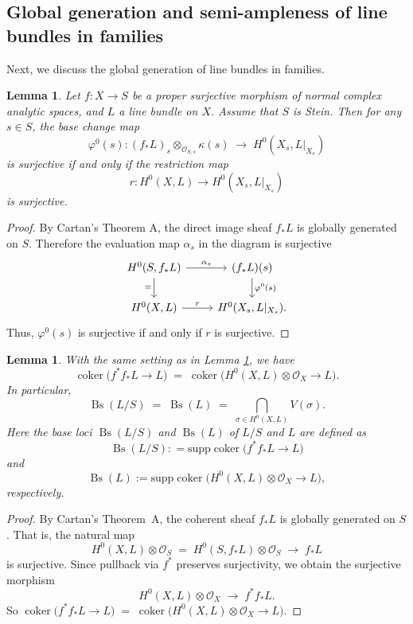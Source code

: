 \documentclass[12pt]{amsart}
\numberwithin{equation}{section}
\newtheorem{lemma}  [theorem]     {Lemma}
\theoremstyle{definition}
\theoremstyle{plain}
\newtheorem*{thm A*}{Theorem A}
\newtheorem*{thm B*}{Theorem B}
\newtheorem*{thm C*}{Theorem C}
\newtheorem*{thm D*}{Theorem D}
\theoremstyle{definition}
\renewcommand{\1}{\mathds{1}}
\renewcommand{\>}{\rightarrow}
\begin{document}
\subsection{Global generation and semi-ampleness of line bundles in families}
Next, we discuss the global generation of line bundles in families.
\begin{lemma}\label{ResBasechange}
Let $f: X \to S$ be a proper surjective morphism of normal complex analytic spaces, and $L$ a line bundle on $X$. Assume that $S$ is Stein.
Then for any $s\in S$, the base change map $$\varphi^0(s): (f_* L)_s \otimes_{\mathcal{O}_{S,s}} \kappa(s) \;\longrightarrow\; H^0(X_s, L|_{X_s})$$ is surjective if and only if the restriction map $$r: H^0(X,L) \to H^0(X_s, L|_{X_s})$$ is surjective. 

\end{lemma}
\begin{proof}
By Cartan's Theorem A, the direct image sheaf $f_*L$ is globally generated on $S$. Therefore the evaluation map $\alpha_s$ in the diagram is surjective
\[
\begin{tikzcd}[ampersand replacement=\&]
	{H^0(S,f_* L)} \& {(f_*L)(s)} \\
	{H^0(X,L)} \& {H^0(X_s,L|_{X_s})}.
	\arrow["{\alpha_s}", from=1-1, to=1-2]
	\arrow["{=}"', from=1-1, to=2-1]
	\arrow["{\varphi^0(s)}", from=1-2, to=2-2]
	\arrow["r", from=2-1, to=2-2]
\end{tikzcd}
\]
Thus, $\varphi^0(s)$ is surjective if and only if $r$ is surjective.
\end{proof}
\begin{lemma}\label{BsoverStein}
With the same setting as in Lemma \ref{ResBasechange}, we have
\[
\operatorname{coker}\!\bigl(f^* f_* L \to L\bigr) \;=\; \operatorname{coker}\!\bigl(H^0(X,L)\otimes \mathcal{O}_X \to L\bigr).
\]
In particular,
\[
\operatorname{Bs}(L/S) \;=\; \operatorname{Bs}(L) \;=\; \bigcap_{\sigma \in H^0(X,L)} V(\sigma).
\]
Here the \emph{base loci} $\operatorname{Bs}(L/S)$ and $\operatorname{Bs}(L)$ of $L/S$ and $L$ are defined as $$\operatorname{Bs}(L/S) : = \mathrm{supp}\operatorname{coker}\!\bigl(f^* f_* L \to L\bigr)$$ and $$\operatorname{Bs}(L):=\mathrm{supp}\operatorname{coker}\!\bigl(H^0(X,L)\otimes \mathcal{O}_X \to L\bigr),$$ respectively. 
\end{lemma}
\begin{proof}
By Cartan's Theorem~A, the coherent sheaf $f_*L$ is globally generated on $S$. That is, the natural map 
\[
H^0(X,L)\otimes \mathcal{O}_S \;=\; H^0(S,f_*L)\otimes \mathcal{O}_S \;\longrightarrow\; f_*L
\]
is surjective. Since pullback via $f^*$ preserves surjectivity, we obtain the surjective morphism
\[
H^0(X,L)\otimes \mathcal{O}_X \;\longrightarrow\; f^* f_* L.
\]
So $
\operatorname{coker}\!\bigl(f^* f_* L \to L\bigr) \;=\; 
\operatorname{coker}\!\bigl(H^0(X,L)\otimes \mathcal{O}_X \to L\bigr)$. 
\end{proof}
\end{document}
